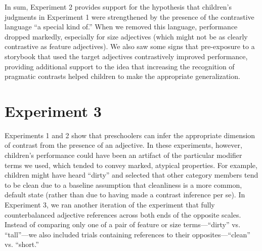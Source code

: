 \documentclass[man]{apa2}
\begin{document}

In sum, Experiment 2 provides support for the hypothesis that children's judgments in Experiment 1 were strengthened by the presence of the contrastive language ``a special kind of.'' When we removed this language, performance dropped markedly, especially for size adjectives (which might not be as clearly contrastive as feature adjectives). We also saw some signs that pre-exposure to a storybook that used the target adjectives contrastively improved performance, providing additional support to the idea that increasing the recognition of pragmatic contrasts helped children to make the appropriate generalization. 




\section{Experiment 3} 

Experiments 1 and 2 show that preschoolers can infer the appropriate dimension of contrast from the presence of an adjective. In these experiments, however, children's performance could have been an artifact of the particular modifier terms we used, which tended to convey marked, atypical properties. For example, children might have heard ``dirty'' and selected that other category members tend to be clean due to a baseline assumption that cleanliness is a more common, default state (rather than due to having made a contrast inference per se). In Experiment 3, we ran another iteration of the experiment that fully counterbalanced adjective references across both ends of the opposite scales. Instead of comparing only one of a pair of feature or size terms---``dirty'' vs. ``tall''---we also included trials containing references to their opposites---``clean'' vs. ``short.''  
\end{document}
